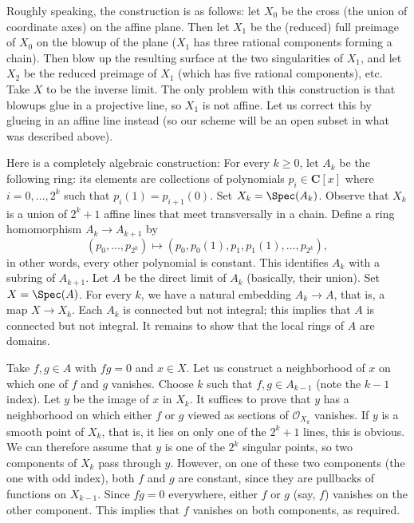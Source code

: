 \medskip\noindent
Roughly speaking, the construction is as follows: let $X_0$ be the cross
(the union of coordinate axes) on the affine plane. Then let $X_1$ be
the (reduced) full preimage of $X_0$ on the blowup of the plane ($X_1$
has three rational components forming a chain).  Then blow up the
resulting surface at the two singularities of $X_1$, and let $X_2$ be
the reduced preimage of $X_1$ (which has five rational components), etc.
Take $X$ to be the inverse limit. The only problem with this construction
is that blowups glue in a projective line, so $X_1$ is not affine. Let us
correct this by glueing in an affine line instead (so our scheme will be an
open subset in what was described above).

\medskip\noindent
Here is a completely algebraic construction: For every $k \ge 0$, let $A_k$
be the following ring: its elements are collections of
polynomials $p_i \in \mathbf{C}[x]$ where $i = 0, \ldots, 2^k$ such that
$p_i(1) = p_{i + 1}(0)$. Set $X_k = \Spec(A_k)$. Observe that $X_k$ is
a union of $2^k + 1$ affine lines that meet transversally in a chain.
Define a ring homomorphism $A_k \to A_{k + 1}$ by
$$
(p_0, \ldots, p_{2^k})
\longmapsto
(p_0, p_0(1), p_1, p_1(1), \ldots, p_{2^k}),
$$
in other words, every other polynomial is constant. This identifies
$A_k$ with a subring of $A_{k + 1}$. Let $A$ be the direct limit of $A_k$
(basically, their union). Set $X = \Spec(A)$. For every $k$, we have
a natural embedding $A_k \to A$, that is, a map $X\to X_k$.
Each $A_k$ is connected but not integral; this implies that $A$ is
connected but not integral. It remains to show that the local rings of
$A$ are domains.

\medskip\noindent
Take $f, g \in A$ with $fg = 0$ and $x \in X$. Let us construct a
neighborhood of $x$ on which one of $f$ and $g$ vanishes. Choose $k$
such that $f, g \in A_{k - 1}$ (note the $k - 1$ index).
Let $y$ be the image of $x$ in $X_k$. It suffices to prove that $y$ has
a neighborhood on which either $f$ or $g$ viewed as sections of
$\mathcal{O}_{X_k}$ vanishes.
If $y$ is a smooth point of $X_k$, that is, it lies on only one of the
$2^k + 1$ lines, this is obvious. We can therefore assume that $y$ is one
of the $2^k$ singular points, so two components of $X_k$ pass through
$y$. However, on one of these two components (the one with odd index),
both $f$ and $g$ are constant, since they are pullbacks of functions on
$X_{k - 1}$. Since $fg = 0$ everywhere, either $f$ or $g$ (say, $f$)
vanishes on the other component.
This implies that $f$ vanishes on both components, as required.






